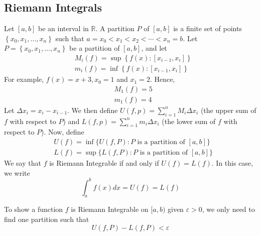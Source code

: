 \subsection{Riemann Integrals}
\begin{definition}
    Let $[a, b]$ be an interval in $\mathbb{R}$. A partition $P$ of $[a, b]$ is a finite set of points $\left\{x_0, x_1, \ldots, x_n\right\}$ such that $a=x_0<x_1<x_2<\cdots<x_n=b$. Let $P=\left\{x_0, x_1, \ldots, x_n\right\}$ be a partition of $[a, b]$, and let
    \begin{align*}
        &M_i(f)=\sup \left\{f(x):\left[x_{i-1}, x_i\right]\right\} \\
        &m_i(f)=\inf \left\{f(x):\left[x_{i-1}, x_i\right]\right\}
    \end{align*}
    For example, $f(x)=x+3, x_0=1$ and $x_1=2$. Hence,
    \begin{align*}
        &M_1(f)=5 \\
        &m_1(f)=4
    \end{align*}
    Let $\Delta x_i=x_i-x_{i-1}$. We then define $U(f, p)=\sum_{i=1}^n M_i \Delta x_i$ (the upper sum of $f$ with respect to $P$) and $L(f, p)=\sum_{i=1}^n m_i \Delta x_i$ (the lower sum of $f$ with respect to $P$). Now, define
    \begin{align*}
        &U(f)=\inf \{U(f, P): P \text { is a partition of }[a, b]\} \\
        &L(f)=\sup \{L(f, P): P \text { is a partition of }[a, b]\}
    \end{align*}
    We say that $f$ is Riemann Integrable if and only if $U(f)=L(f)$. In this case, we write $$\int_a^b f(x) d x=U(f)=L(f)$$
\end{definition}

\noindent To show a function $f$ is Riemann Integrable on $[a, b)$ given $\varepsilon>0$, we only need to find one partition such that $$U(f, P)-L(f, P)<\varepsilon$$